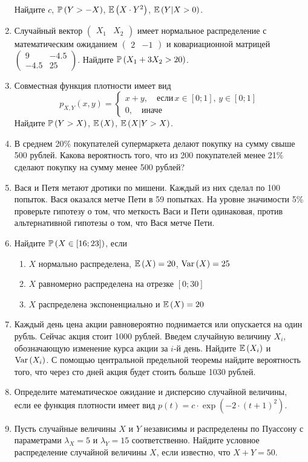 \begin{enumerate}
Найдите  $c$,  $\P\left(Y>-X\right)$,  $\E\left(X\cdot Y^{2} \right)$,
$\E\left(Y|X>0\right)$.
\item Случайный вектор  $\left(\begin{array}{cc} {X_{1} } & {X_{2} } \end{array}\right)$
имеет нормальное распределение с математическим ожиданием $\left(\begin{array}{cc} {2}
& {-1} \end{array}\right)$ и ковариационной матрицей $\left(\begin{array}{cc} {9}
& {-4.5} \\ {-4.5} & {25} \end{array}\right)$.
Найдите $\P\left(X_{1} +3X_{2} >20\right)$.
\item Совместная функция плотности имеет вид
\[
p_{X,Y} \left(x,y\right)=\left\{\begin{array}{l} {x+y,\quad \text{если}\, x\in \left[0;1\right],\, y\in \left[0;1\right]} \\ {0,\quad \text{иначе}} \end{array}\right.
\]
Найдите  $\P\left(Y>X\right)$,  $\E\left(X\right)$,  $\E\left(X|Y>X\right)$.
\item В среднем 20\% покупателей супермаркета делают покупку на сумму свыше 500 рублей.
Какова вероятность того, что из 200 покупателей менее 21\% сделают покупку на сумму
менее 500 рублей?
\item Вася и Петя метают дротики по мишени. Каждый из них сделал по 100 попыток.
Вася оказался метче Пети в 59 попытках. На уровне значимости 5\% проверьте гипотезу
о том, что меткость Васи и Пети одинаковая, против альтернативной гипотезы о том,
что Вася метче Пети.
\item Найдите  $\P\left(X\in \left[16;23\right]\right)$, если
\begin{enumerate}
\item $X$  нормально распределена,  $\E\left(X\right)=20$,  $\Var\left(X\right)=25$
\item $X$  равномерно распределена на отрезке  $\left[0;30\right]$
\item $X$  распределена экспоненциально и  $\E\left(X\right)=20$
\end{enumerate}
\item Каждый день цена акции равновероятно поднимается или опускается на один рубль.
Сейчас акция стоит 1000 рублей. Введем случайную величину  $X_{i} $, обозначающую
изменение курса акции за  $i$-й день. Найдите  $\E\left(X_{i} \right)$ и $\Var\left(X_{i} \right)$.
С помощью центральной предельной теоремы найдите вероятность того, что через сто
дней акция будет стоить больше 1030 рублей.
\item Определите математическое ожидание и дисперсию случайной величины, если ее
функция плотности имеет вид $p\left(t\right)=c\cdot \exp \left(-2\cdot \left(t+1\right)^{2} \right)$.
\item Пусть случайные величины $X$ и $Y$ независимы и распределены по Пуассону с
параметрами $\lambda _{X} =5$ и $\lambda _{Y} =15$ соответственно. Найдите условное
распределение случайной величины $X$, если известно, что $X+Y=50$.
\end{enumerate}

